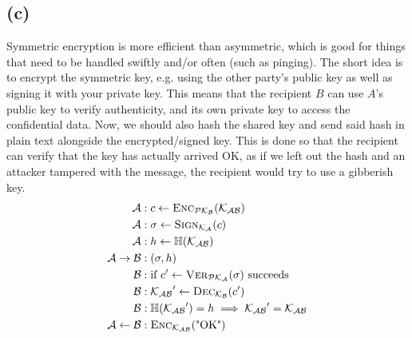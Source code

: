 \documentclass{article}
\begin{document}
\subsection*{(c)}
Symmetric encryption is more efficient than asymmetric, which is good for things that need to be handled swiftly and/or often (such as pinging). The short idea is to encrypt the symmetric key, e.g. using the other party's public key as well as signing it with your private key. This means that the recipient $B$ can use $A$'s public key to verify authenticity, and its own private key to access the confidential data. Now, we should also hash the shared key and send said hash in plain text alongside the encrypted/signed key. This is done so that the recipient can verify that the key has actually arrived OK, as if we left out the hash and an attacker tampered with the message, the recipient would try to use a gibberish key.%
\\

\begin{align*}
    \mathcal{A} &: c \leftarrow \textsc{Enc}_{\mathcal{PK_B}}(\mathcal{K_{AB}})
    \\
    \mathcal{A} &: \sigma \leftarrow \textsc{Sign}_{\mathcal{K_A}}(c)
    \\
    \mathcal{A} &: h \leftarrow \mathbb{H} (\mathcal{K_{AB}})
    \\
    \mathcal{A} \rightarrow \mathcal{B} &: (\sigma, h)
    \\
    \mathcal{B} &: \text{if } c' \leftarrow \textsc{Ver}_{\mathcal{PK_A}}(\sigma) \text{ succeeds}
    \\
    \mathcal{B} &: \mathcal{K_{AB}}' \leftarrow \textsc{Dec}_\mathcal{K_B}(c')
    \\
    \mathcal{B} &: \mathbb{H}(\mathcal{K_{AB}}') = h \implies \mathcal{K_{AB}}' = \mathcal{K_{AB}}
    \\
    \mathcal{A} \leftarrow \mathcal{B} &: \textsc{Enc}_{\mathcal{K_{AB}}}(\text{"OK"})
\end{align*}
\end{document}
